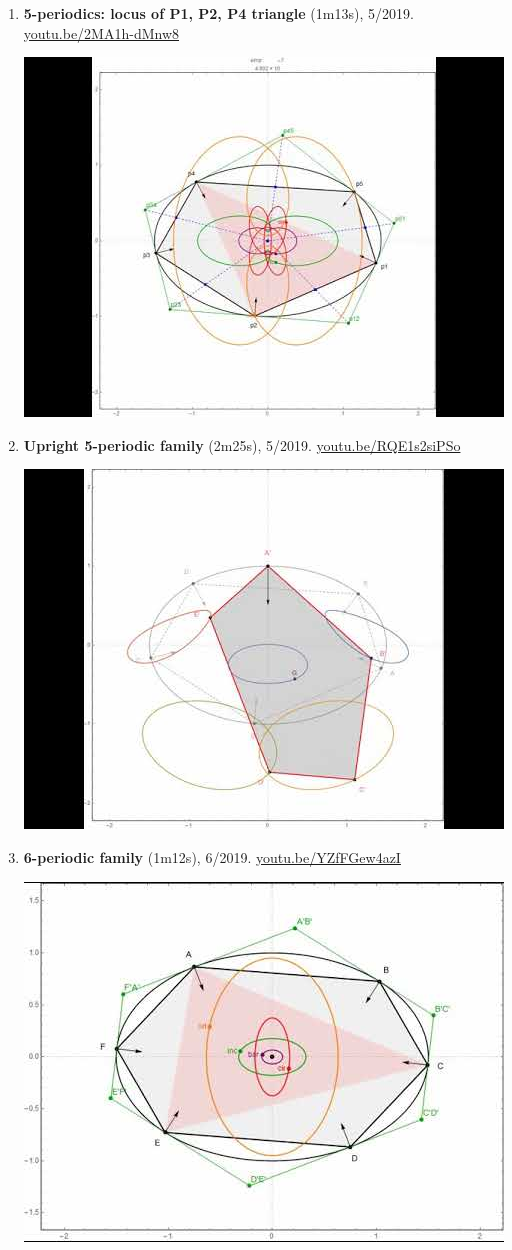 \documentclass[12pt]{article}
\begin{document}
\begin{enumerate}[resume]
% 
\item \textbf{5-periodics: locus of P1, P2, P4 triangle} (1m13s), 5/2019. \href{https://youtu.be/2MA1h-dMnw8}{\url{youtu.be/2MA1h-dMnw8}}
\begin{center}\includegraphics[width=.5\textwidth]{pics/2MA1h-dMnw8.jpg}\end{center}
% 
\item \textbf{Upright 5-periodic family} (2m25s), 5/2019. \href{https://youtu.be/RQE1s2siPSo}{\url{youtu.be/RQE1s2siPSo}}
\begin{center}\includegraphics[width=.5\textwidth]{pics/RQE1s2siPSo.jpg}\end{center}
% 
\item \textbf{6-periodic family} (1m12s), 6/2019. \href{https://youtu.be/YZfFGew4azI}{\url{youtu.be/YZfFGew4azI}}
\begin{center}\includegraphics[width=.5\textwidth]{pics/YZfFGew4azI.jpg}\end{center}

\end{enumerate}
\end{document}
